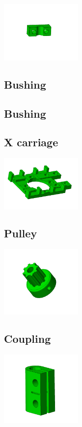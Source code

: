 \documentclass[11pt]{article}
\begin{document}
\includegraphics[width=4cm]{images/rod-clamp.jpg}
\subsection{Bushing}


\subsection{Bushing}


\subsection{X carriage}


\includegraphics[width=4cm]{images/x-carriage.jpg}
\subsection{Pulley}


\includegraphics[width=4cm]{images/pulley.jpg}
\subsection{Coupling}


\includegraphics[width=4cm]{images/coupling.jpg}
\end{document}
